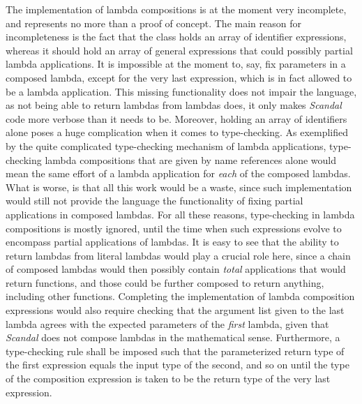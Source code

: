 The implementation of lambda compositions is at the moment very incomplete, and represents no more than a proof of concept. The main reason for incompleteness is the fact that the  class holds an array of identifier expressions, whereas it should hold an array of general expressions that could possibly partial lambda applications. It is impossible at the moment to, say, fix parameters in a composed lambda, except for the very last expression, which is in fact allowed to be a lambda application. This missing functionality does not impair the language, as not being able to return lambdas from lambdas does, it only makes \emph{Scandal} code more verbose than it needs to be. Moreover, holding an array of identifiers alone poses a huge complication when it comes to type-checking. As exemplified by the quite complicated type-checking mechanism of lambda applications, type-checking lambda compositions that are given by name references alone would mean the same effort of a lambda application for \emph{each} of the composed lambdas. What is worse, is that all this work would be a waste, since such implementation would still not provide the language the functionality of fixing partial applications in composed lambdas. For all these reasons, type-checking in lambda compositions is mostly ignored, until the time when such expressions evolve to encompass partial applications of lambdas. It is easy to see that the ability to return lambdas from literal lambdas would play a crucial role here, since a chain of composed lambdas would then possibly contain \emph{total} applications that would return functions, and those could be further composed to return anything, including other functions. Completing the implementation of lambda composition expressions would also require checking that the argument list given to the last lambda agrees with the expected parameters of the \emph{first} lambda, given that \emph{Scandal} does not compose lambdas in the mathematical sense. Furthermore, a type-checking rule shall be imposed such that the parameterized return type of the first expression equals the input type of the second, and so on until the type of the composition expression is taken to be the return type of the very last expression.